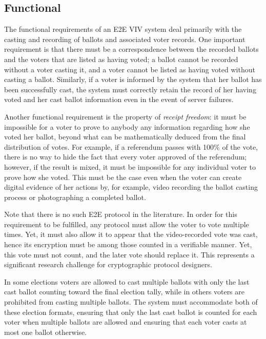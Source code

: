\subsection{Functional} 
\label{sec:functional}

The functional requirements of an E2E VIV system deal primarily with
the casting and recording of ballots and associated voter records. One
important requirement is that there must be a correspondence between
the recorded ballots and the voters that are listed as having voted; a
ballot cannot be recorded without a voter casting it, and a voter
cannot be listed as having voted without casting a ballot. Similarly,
if a voter is informed by the system that her ballot has been
successfully cast, the system must correctly retain the record of her
having voted and her cast ballot information even in the event of
server failures.

Another functional requirement is the property of \emph{receipt
  freedom}: it must be impossible for a voter to prove to anybody any
information regarding how she voted her ballot, beyond what can be
mathematically deduced from the final distribution of votes. For
example, if a referendum passes with 100\% of the vote, there is no
way to hide the fact that every voter approved of the referendum;
however, if the result is mixed, it must be impossible for any
individual voter to prove how she voted.  This must be the case even
when the voter can create digital evidence of her actions by, for
example, video recording the ballot casting process or photographing a
completed ballot.

Note that there is no such E2E protocol in the literature. In order
for this requirement to be fulfilled, any protocol must allow the
voter to vote multiple times.  Yet, it must also allow it to appear
that the video-recorded vote was cast, hence its encryption must be
among those counted in a verifiable manner. Yet, this vote must not
count, and the later vote should replace it. This represents a
significant research challenge for cryptographic protocol designers.

In some elections voters are allowed to cast multiple ballots with
only the last cast ballot counting toward the final election tally,
while in others voters are prohibited from casting multiple
ballots. The system must accommodate both of these election formats,
ensuring that only the last cast ballot is counted for each voter when
multiple ballots are allowed and ensuring that each voter casts at
most one ballot otherwise.

